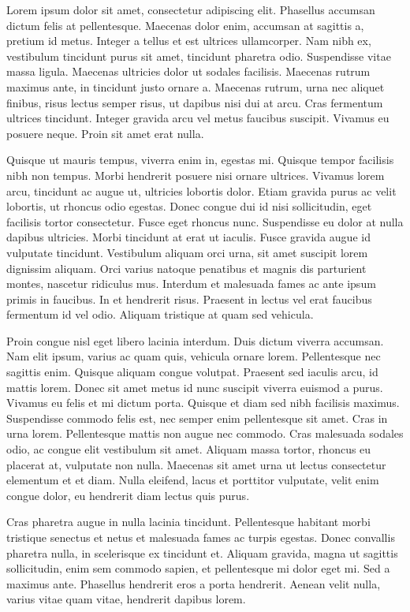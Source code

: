 

Lorem ipsum dolor sit amet, consectetur adipiscing elit. Phasellus accumsan dictum felis at pellentesque. Maecenas dolor enim, accumsan at sagittis a, pretium id metus. Integer a tellus et est ultrices ullamcorper. Nam nibh ex, vestibulum tincidunt purus sit amet, tincidunt pharetra odio. Suspendisse vitae massa ligula. Maecenas ultricies dolor ut sodales facilisis. Maecenas rutrum maximus ante, in tincidunt justo ornare a. Maecenas rutrum, urna nec aliquet finibus, risus lectus semper risus, ut dapibus nisi dui at arcu. Cras fermentum ultrices tincidunt. Integer gravida arcu vel metus faucibus suscipit. Vivamus eu posuere neque. Proin sit amet erat nulla.

Quisque ut mauris tempus, viverra enim in, egestas mi. Quisque tempor facilisis nibh non tempus. Morbi hendrerit posuere nisi ornare ultrices. Vivamus lorem arcu, tincidunt ac augue ut, ultricies lobortis dolor. Etiam gravida purus ac velit lobortis, ut rhoncus odio egestas. Donec congue dui id nisi sollicitudin, eget facilisis tortor consectetur. Fusce eget rhoncus nunc. Suspendisse eu dolor at nulla dapibus ultricies. Morbi tincidunt at erat ut iaculis. Fusce gravida augue id vulputate tincidunt. Vestibulum aliquam orci urna, sit amet suscipit lorem dignissim aliquam. Orci varius natoque penatibus et magnis dis parturient montes, nascetur ridiculus mus. Interdum et malesuada fames ac ante ipsum primis in faucibus. In et hendrerit risus. Praesent in lectus vel erat faucibus fermentum id vel odio. Aliquam tristique at quam sed vehicula.

Proin congue nisl eget libero lacinia interdum. Duis dictum viverra accumsan. Nam elit ipsum, varius ac quam quis, vehicula ornare lorem. Pellentesque nec sagittis enim. Quisque aliquam congue volutpat. Praesent sed iaculis arcu, id mattis lorem. Donec sit amet metus id nunc suscipit viverra euismod a purus. Vivamus eu felis et mi dictum porta. Quisque et diam sed nibh facilisis maximus. Suspendisse commodo felis est, nec semper enim pellentesque sit amet. Cras in urna lorem. Pellentesque mattis non augue nec commodo. Cras malesuada sodales odio, ac congue elit vestibulum sit amet. Aliquam massa tortor, rhoncus eu placerat at, vulputate non nulla. Maecenas sit amet urna ut lectus consectetur elementum et et diam. Nulla eleifend, lacus et porttitor vulputate, velit enim congue dolor, eu hendrerit diam lectus quis purus.

Cras pharetra augue in nulla lacinia tincidunt. Pellentesque habitant morbi tristique senectus et netus et malesuada fames ac turpis egestas. Donec convallis pharetra nulla, in scelerisque ex tincidunt et. Aliquam gravida, magna ut sagittis sollicitudin, enim sem commodo sapien, et pellentesque mi dolor eget mi. Sed a maximus ante. Phasellus hendrerit eros a porta hendrerit. Aenean velit nulla, varius vitae quam vitae, hendrerit dapibus lorem.

